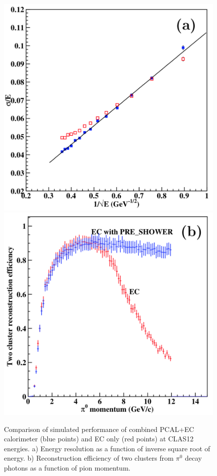 \begin{figure}[hbt]
\centering
\includegraphics[width=0.85\columnwidth,keepaspectratio]{img/S2_1_a.png}
\includegraphics[width=0.85\columnwidth,keepaspectratio]{img/S2_1_b.png}
\caption[Simulated performance]{Comparison of simulated performance of combined PCAL+EC calorimeter (blue points) and EC only (red points) at CLAS12 energies. a) Energy resolution as a function of inverse square root of energy. b) Reconstruction efficiency of two clusters from $\pi^{0}$ decay photons as a function of pion momentum.}
\label{fig:S2_1}
\end{figure}

